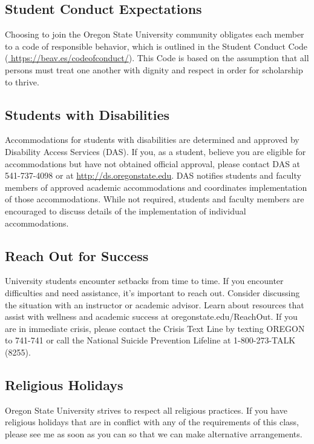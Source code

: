 \documentclass[10pt]{article}
\begin{document}
\subsection*{Student Conduct Expectations}
Choosing to join the Oregon State University community obligates each 
member to a code of responsible behavior, which is outlined in the Student 
Conduct Code
(\href{https://beav.es/codeofconduct/}{ https://beav.es/codeofconduct/}).
This Code is based on the assumption that all persons must treat one another 
with dignity and respect in order for scholarship to thrive.

\subsection*{Students with Disabilities}
Accommodations for students with disabilities are determined and approved by 
Disability Access Services (DAS).
If you, as a student, believe you are eligible for accommodations but have not 
obtained official approval, please contact DAS at 541-737-4098 or at
\href{http://ds.oregonstate.edu}{http://ds.oregonstate.edu}.
DAS notifies students and faculty members of approved academic 
accommodations and coordinates implementation of those accommodations.
While not required, students and faculty members are encouraged to discuss 
details of the implementation of individual accommodations.

\subsection*{Reach Out for Success}
University students encounter setbacks from time to time. 
If you encounter difficulties and need assistance, it’s important to reach out. 
Consider discussing the situation with an instructor or academic advisor. 
Learn about resources that assist with wellness and academic success at 
oregonstate.edu/ReachOut. 
If you are in immediate crisis, please contact the Crisis Text Line by texting 
OREGON to 741-741 or call the National Suicide Prevention Lifeline at 
1-800-273-TALK (8255).

\subsection*{Religious Holidays}
Oregon State University strives to respect all religious practices.
If you have religious holidays that are in conflict with any of the requirements of 
this class, please see me as soon as you can so that we can make alternative 
arrangements.
\end{document}
